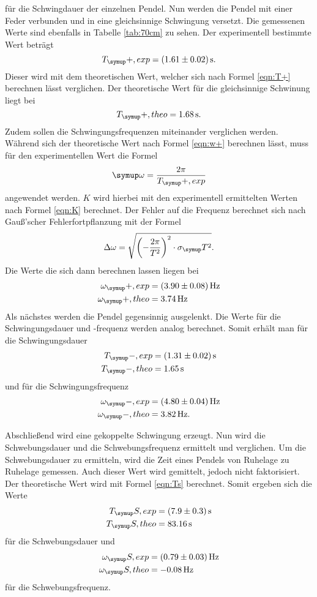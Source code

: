 für die Schwingdauer der einzelnen Pendel. Nun werden die Pendel mit einer Feder
verbunden und in eine gleichsinnige Schwingung versetzt. Die gemessenen Werte
sind ebenfalls in Tabelle \ref{tab:70cm} zu sehen. Der experimentell bestimmte
Wert beträgt
\begin{equation*}
  T_\su{+, exp}=(1.61\pm0.02)\sek.
\end{equation*}
Dieser wird mit dem theoretischen Wert, welcher sich nach Formel \eqref{eqn:T+}
berechnen lässt verglichen. Der theoretische Wert für die gleichsinnige Schwinung
liegt bei
\begin{equation*}
  T_\su{+, theo}=1.68\sek.
\end{equation*}
Zudem sollen die Schwingungsfrequenzen miteinander verglichen werden. Während sich
der theoretische Wert nach Formel \eqref{eqn:w+}
berechnen lässt, muss für den experimentellen Wert die Formel
\begin{equation}
  \su{\omega}=\frac{2\pi}{T_\su{+, exp}}
  \label{eqn:wexp}
\end{equation}
angewendet werden. $K$ wird hierbei mit den experimentell ermittelten Werten nach
Formel \eqref{eqn:K} berechnet. Der Fehler auf die Frequenz berechnet sich nach
Gauß'scher Fehlerfortpflanzung mit der Formel
\begin{equation}
  \Delta\omega=\sqrt{\biggl(-\frac{2\pi}{T^2}\biggr)^2\cdot\sigma_\su{T}^2}.
\end{equation}
Die Werte die sich dann berechnen lassen liegen bei
\begin{align*}
  \omega_\su{+,exp}  &= (3.90 \pm 0.08)\Hz \\
  \omega_\su{+,theo} &= 3.74\Hz
\end{align*}
Als nächstes werden die Pendel gegensinnig ausgelenkt. Die Werte für die
Schwingungsdauer und -frequenz werden analog berechnet. Somit erhält man für die
Schwingungsdauer
\begin{align*}
  T_\su{-, exp} &= (1.31\pm0.02)\sek \\
  T_\su{-, theo} &= 1.65\sek
\end{align*}
und für die Schwingungsfrequenz
\begin{align*}
  \omega_\su{-, exp}  &= (4.80 \pm 0.04)\Hz \\
  \omega_\su{-, theo} &= 3.82\Hz.
\end{align*}

Abschließend wird eine gekoppelte Schwingung erzeugt. Nun wird die
Schwebungsdauer und die Schwebungsfrequenz ermittelt und verglichen. Um die
Schwebungsdauer zu ermitteln, wird die Zeit eines Pendels von Ruhelage zu
Ruhelage gemessen. Auch dieser Wert wird gemittelt, jedoch nicht faktorisiert.
Der theoretische Wert wird mit Formel \eqref{eqn:Ts} berechnet. Somit ergeben
sich die Werte
\begin{align*}
  T_\su{S, exp} &= (7.9\pm0.3)\sek \\
  T_\su{S,theo} &= 83.16\sek
\end{align*}
für die Schwebungsdauer und
\begin{align*}
  \omega_\su{S, exp} &= (0.79 \pm 0.03)\Hz \\
  \omega_\su{S, theo}&= -0.08\Hz
\end{align*}
für die Schwebungsfrequenz.
